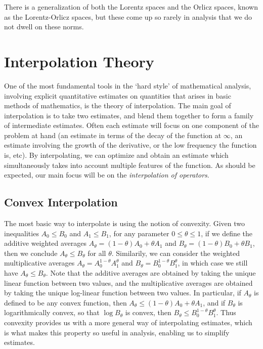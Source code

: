 There is a generalization of both the Lorentz spaces and the Orlicz spaces, known as the Lorentz-Orlicz spaces, but these come up so rarely in analysis that we do not dwell on these norms.
















\chapter{Interpolation Theory}

One of the most fundamental tools in the `hard style' of mathematical analysis, involving explicit quantitative estimates on quantities that arises in basic methods of mathematics, is the theory of interpolation. The main goal of interpolation is to take two estimates, and blend them together to form a family of intermediate estimates. Often each estimate will focus on one component of the problem at hand (an estimate in terms of the decay of the function at $\infty$, an estimate involving the growth of the derivative, or the low frequency the function is, etc). By interpolating, we can optimize and obtain an estimate which simultaneously takes into account multiple features of the function. As should be expected, our main focus will be on the \emph{interpolation of operators}.

\section{Convex Interpolation}

The most basic way to interpolate is using the notion of convexity. Given two inequalities $A_0 \leq B_0$ and $A_1 \leq B_1$, for any parameter $0 \leq \theta \leq 1$, if we define the additive weighted averages $A_\theta = (1 - \theta) A_0 + \theta A_1$ and $B_\theta = (1 - \theta) B_0 + \theta B_1$, then we conclude $A_\theta \leq B_\theta$ for all $\theta$. Similarily, we can consider the weighted multiplicative averages $A_\theta = A_0^{1 - \theta} A_1^\theta$ and $B_\theta = B_0^{1 - \theta}B_1^\theta$, in which case we still have $A_\theta \leq B_\theta$. Note that the additive averages are obtained by taking the unique linear function between two values, and the multiplicative averages are obtained by taking the unique log-linear function between two values. In particular, if $A_\theta$ is defined to be any convex function, then $A_\theta \leq (1 - \theta) A_0 + \theta A_1$, and if $B_\theta$ is logarithmically convex, so that $\log B_\theta$ is convex, then $B_\theta \leq B_0^{1 - \theta} B_1^\theta$. Thus convexity provides us with a more general way of interpolating estimates, which is what makes this property so useful in analysis, enabling us to simplify estimates.

